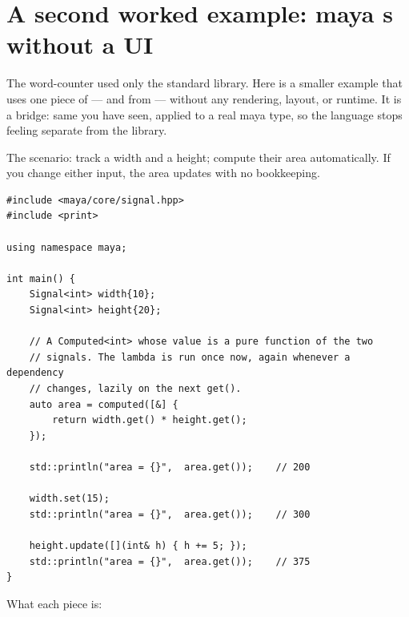 \section{A second worked example: maya s without a UI}
\label{sec:cpp:worked2}

The word-counter used only the standard library. Here is a smaller
example that uses one piece of \maya{} ---  and
 from  --- without any
rendering, layout, or runtime. It is a bridge: same \cpp{} you have
seen, applied to a real maya type, so the language stops feeling
separate from the library.

The scenario: track a width and a height; compute their area
automatically. If you change either input, the area updates with no
bookkeeping.

\begin{lstlisting}
#include <maya/core/signal.hpp>
#include <print>

using namespace maya;

int main() {
    Signal<int> width{10};
    Signal<int> height{20};

    // A Computed<int> whose value is a pure function of the two
    // signals. The lambda is run once now, again whenever a dependency
    // changes, lazily on the next get().
    auto area = computed([&] {
        return width.get() * height.get();
    });

    std::println("area = {}",  area.get());    // 200

    width.set(15);
    std::println("area = {}",  area.get());    // 300

    height.update([](int& h) { h += 5; });
    std::println("area = {}",  area.get());    // 375
}
\end{lstlisting}

What each piece is:

